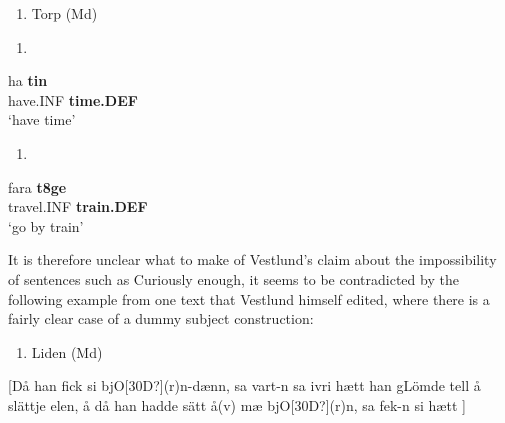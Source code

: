 \begin{enumerate} %
\item 
Torp (Md)

\end{enumerate} %
\setcounter{listLFOxcviiileveli}{0}
\begin{enumerate} %
\item 
\end{enumerate} %
\ea\label{}
\gll ha  \textbf{tin} \\


have.INF  \textbf{time.DEF} \\ %


‘have time’
\z


\begin{enumerate} %
\item 
\end{enumerate} %
\ea\label{}
\gll fara  \textbf{t}\textbf{8}\textbf{ge}\\


travel.INF  \textbf{train.DEF}\\ %


‘go by train’
\z


It is therefore unclear what to make of Vestlund’s claim about the impossibility of sentences such as Curiously enough, it seems to be contradicted by the following example from one text that Vestlund himself edited, where there is a fairly clear case of a dummy subject construction:

\begin{enumerate} %
\item 
Liden (Md)

\end{enumerate} %
[Då han fick si bjO[30D?](r)n{}-dænn, sa vart-n sa ivri hætt han gLömde tell å slättje elen, å då han hadde sätt å(v) mæ bjO[30D?](r)n, sa fek-n si hætt ]


